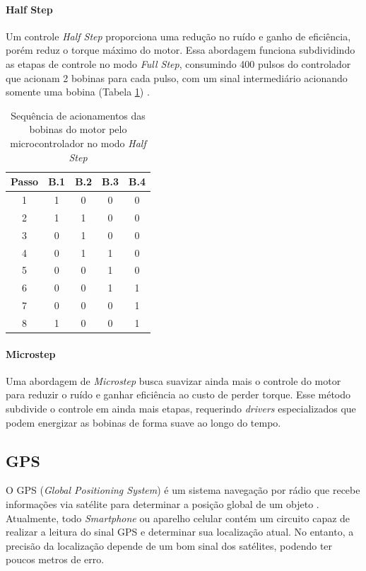 \paragraph{Half Step}
Um controle \textit{Half Step} proporciona uma redução no ruído e ganho de eficiência, porém reduz o torque máximo do motor. Essa abordagem funciona subdividindo as etapas de controle no modo \textit{Full Step}, consumindo 400 pulsos do controlador que acionam 2 bobinas para cada pulso, com um sinal intermediário acionando somente uma bobina (Tabela \ref{tab:hs}) \cite{man:advancedmicrosystemStepControl}.

\begin{table}[!htb]
	\centering	
	\caption{Sequência de acionamentos das bobinas do motor pelo microcontrolador no modo \textit{Half Step}}
	\begin{tabular}{c|c|c|c|c}
				Passo & B.1 & B.2 & B.3 & B.4 \\\hline
		1	& 1 & 0 & 0 & 0\\
		2	& 1 & 1 & 0 & 0\\
		3	& 0 & 1 & 0 & 0\\
		4	& 0 & 1	& 1 & 0\\
		5	& 0 & 0 & 1 & 0\\
		6	& 0 & 0 & 1 & 1\\
		7	& 0 & 0 & 0 & 1\\
		8	& 1 & 0	& 0 & 1\\
	\end{tabular}
	\label{tab:hs}
\end{table}

\paragraph{Microstep}
Uma abordagem de \textit{Microstep} busca suavizar ainda mais o controle do motor para reduzir o ruído e ganhar eficiência ao custo de perder torque. Esse método subdivide o controle em ainda mais etapas, requerindo \textit{drivers} especializados que podem energizar as bobinas de forma suave ao longo do tempo. 

\subsection{GPS}
O GPS (\textit{Global Positioning System}) é um sistema navegação por rádio que recebe informações via satélite para determinar a posição global de um objeto \cite{apostilagps}. Atualmente, todo \textit{Smartphone} ou aparelho celular contém um circuito capaz de realizar a leitura do sinal GPS e determinar sua localização atual. No entanto, a precisão da localização depende de um bom sinal dos satélites, podendo ter poucos metros de erro.

